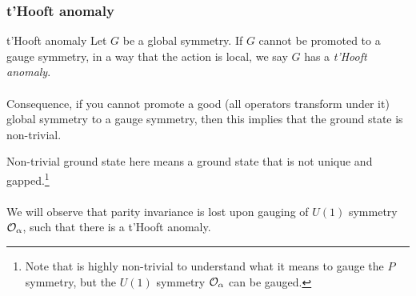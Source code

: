 \subsubsection{t'Hooft anomaly}
\begin{mybox}{t'Hooft anomaly}
	Let $G$ be a global symmetry. If $G$ cannot be promoted to a gauge symmetry, in a way that the action is local, we say $G$ has a \emph{t'Hooft anomaly}.\\
\\
	Consequence, if you cannot promote a good (all operators transform under it) global symmetry to a gauge symmetry, then this implies that the ground state is non-trivial.
\end{mybox}
Non-trivial ground state here means a ground state that is not unique and gapped.\footnote{Note that is highly non-trivial to understand what it means to gauge the $P$ symmetry, but the $U(1)$ symmetry $\mathcal{O}_\alpha$ can be gauged.}
\\
\\
We will observe that parity invariance is lost upon gauging of $U(1)$ symmetry $\mathcal{O}_\alpha$, such that there is a t'Hooft anomaly.







